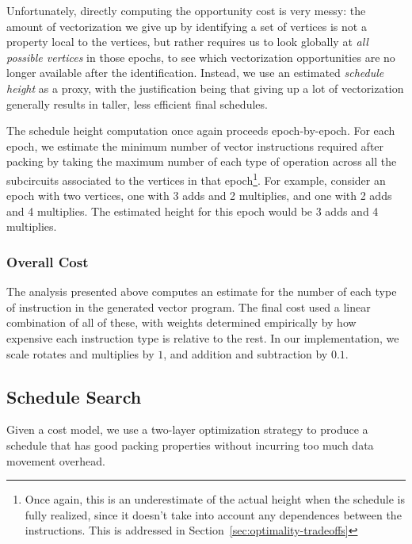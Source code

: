 Unfortunately, directly computing the opportunity cost is very messy: the amount of vectorization we give up by identifying a set of vertices is not a property local to the vertices, but rather requires us to look globally at {\em all possible vertices} in those epochs, to see which vectorization opportunities are no longer available after the identification.
Instead, we use an estimated {\em schedule height} as a proxy, with the justification being that giving up a lot of vectorization generally results in taller, less efficient final schedules. 

The schedule height computation once again proceeds epoch-by-epoch.
For each epoch, we estimate the minimum number of vector instructions required after packing by taking the maximum number of each type of operation across all the subcircuits associated to the vertices in that epoch\footnote{Once again, this is an underestimate of the actual height when the schedule is fully realized, since it doesn't take into account any dependences between the instructions. This is addressed in Section~\ref{sec:optimality-tradeoffs}}.
For example, consider an epoch with two vertices, one with 3 adds and 2 multiplies, and one with 2 adds and 4 multiplies.
The estimated height for this epoch would be 3 adds and 4 multiplies.

\subsubsection*{Overall Cost}
The analysis presented above computes an estimate for the number of each type of instruction in the generated vector program.
The final cost used a linear combination of all of these, with weights determined empirically by how expensive each instruction type is relative to the rest.
In our implementation, we scale rotates and multiplies by $1$, and addition and subtraction by $0.1$. 

\subsection{Schedule Search}\label{sec:schedule-search}
Given a cost model, we use a two-layer optimization strategy to produce a schedule that has good packing properties without incurring too much data movement overhead.
